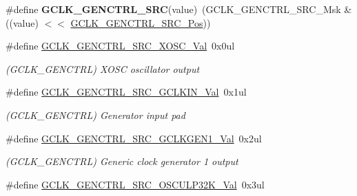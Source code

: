 \begin{DoxyCompactItemize}
\item 
\hypertarget{group___s_a_m_l21___g_c_l_k_ga3a6ecbe6a1395577e386ee2046c5e3a5}{}\#define {\bfseries G\+C\+L\+K\+\_\+\+G\+E\+N\+C\+T\+R\+L\+\_\+\+S\+R\+C}(value)~(G\+C\+L\+K\+\_\+\+G\+E\+N\+C\+T\+R\+L\+\_\+\+S\+R\+C\+\_\+\+Msk \& ((value) $<$$<$ \hyperlink{group___s_a_m_l21___g_c_l_k_ga3ca6fb0d36a0f1194282d2517b22965f}{G\+C\+L\+K\+\_\+\+G\+E\+N\+C\+T\+R\+L\+\_\+\+S\+R\+C\+\_\+\+Pos}))\label{group___s_a_m_l21___g_c_l_k_ga3a6ecbe6a1395577e386ee2046c5e3a5}

\item 
\hypertarget{group___s_a_m_l21___g_c_l_k_gad48c4f5ba6b5112eef4d978cf2ae73bc}{}\#define \hyperlink{group___s_a_m_l21___g_c_l_k_gad48c4f5ba6b5112eef4d978cf2ae73bc}{G\+C\+L\+K\+\_\+\+G\+E\+N\+C\+T\+R\+L\+\_\+\+S\+R\+C\+\_\+\+X\+O\+S\+C\+\_\+\+Val}~0x0ul\label{group___s_a_m_l21___g_c_l_k_gad48c4f5ba6b5112eef4d978cf2ae73bc}

\begin{DoxyCompactList}\small\item\em (G\+C\+L\+K\+\_\+\+G\+E\+N\+C\+T\+R\+L) X\+O\+S\+C oscillator output \end{DoxyCompactList}\item 
\hypertarget{group___s_a_m_l21___g_c_l_k_ga4c279c59a26c988991b63eb2682e8acc}{}\#define \hyperlink{group___s_a_m_l21___g_c_l_k_ga4c279c59a26c988991b63eb2682e8acc}{G\+C\+L\+K\+\_\+\+G\+E\+N\+C\+T\+R\+L\+\_\+\+S\+R\+C\+\_\+\+G\+C\+L\+K\+I\+N\+\_\+\+Val}~0x1ul\label{group___s_a_m_l21___g_c_l_k_ga4c279c59a26c988991b63eb2682e8acc}

\begin{DoxyCompactList}\small\item\em (G\+C\+L\+K\+\_\+\+G\+E\+N\+C\+T\+R\+L) Generator input pad \end{DoxyCompactList}\item 
\hypertarget{group___s_a_m_l21___g_c_l_k_ga2774be4de7707cea940a2b7ec37f30e3}{}\#define \hyperlink{group___s_a_m_l21___g_c_l_k_ga2774be4de7707cea940a2b7ec37f30e3}{G\+C\+L\+K\+\_\+\+G\+E\+N\+C\+T\+R\+L\+\_\+\+S\+R\+C\+\_\+\+G\+C\+L\+K\+G\+E\+N1\+\_\+\+Val}~0x2ul\label{group___s_a_m_l21___g_c_l_k_ga2774be4de7707cea940a2b7ec37f30e3}

\begin{DoxyCompactList}\small\item\em (G\+C\+L\+K\+\_\+\+G\+E\+N\+C\+T\+R\+L) Generic clock generator 1 output \end{DoxyCompactList}\item 
\hypertarget{group___s_a_m_l21___g_c_l_k_ga42e2c1ea6d7f04f75657e31791336ec6}{}\#define \hyperlink{group___s_a_m_l21___g_c_l_k_ga42e2c1ea6d7f04f75657e31791336ec6}{G\+C\+L\+K\+\_\+\+G\+E\+N\+C\+T\+R\+L\+\_\+\+S\+R\+C\+\_\+\+O\+S\+C\+U\+L\+P32\+K\+\_\+\+Val}~0x3ul\label{group___s_a_m_l21___g_c_l_k_ga42e2c1ea6d7f04f75657e31791336ec6}


\end{DoxyCompactItemize}
